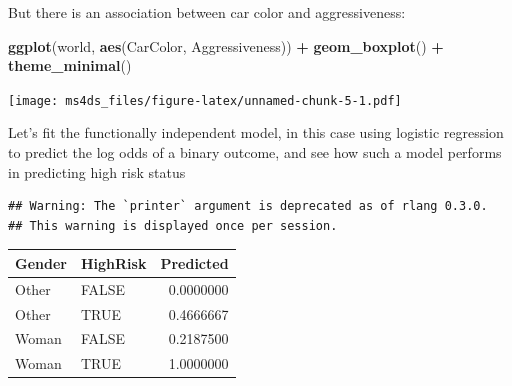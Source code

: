 \documentclass[]{book}
\newenvironment{Shaded}{\begin{snugshade}}{\end{snugshade}}
\newcommand{\KeywordTok}[1]{\textcolor[rgb]{0.13,0.29,0.53}{\textbf{#1}}}
\newcommand{\DataTypeTok}[1]{\textcolor[rgb]{0.13,0.29,0.53}{#1}}
\newcommand{\StringTok}[1]{\textcolor[rgb]{0.31,0.60,0.02}{#1}}
\newcommand{\OperatorTok}[1]{\textcolor[rgb]{0.81,0.36,0.00}{\textbf{#1}}}
\newcommand{\NormalTok}[1]{#1}
\theoremstyle{definition}
\theoremstyle{definition}
\theoremstyle{definition}
\theoremstyle{remark}
\begin{document}
But there is an association between car color and aggressiveness:

\begin{Shaded}
\begin{Highlighting}[]
\KeywordTok{ggplot}\NormalTok{(world, }\KeywordTok{aes}\NormalTok{(CarColor, Aggressiveness)) }\OperatorTok{+}\StringTok{ }\KeywordTok{geom_boxplot}\NormalTok{() }\OperatorTok{+}\StringTok{ }\KeywordTok{theme_minimal}\NormalTok{()}
\end{Highlighting}
\end{Shaded}

\texttt{[image: ms4ds\_files/figure-latex/unnamed-chunk-5-1.pdf]}

Let's fit the functionally independent model, in this case using
logistic regression to predict the log odds of a binary outcome, and see
how such a model performs in predicting high risk status

\begin{Shaded}
\end{Shaded}

\begin{verbatim}
## Warning: The `printer` argument is deprecated as of rlang 0.3.0.
## This warning is displayed once per session.
\end{verbatim}

\begin{tabular}{l|l|r}
\hline
Gender & HighRisk & Predicted\\
\hline
Other & FALSE & 0.0000000\\
\hline
Other & TRUE & 0.4666667\\
\hline
Woman & FALSE & 0.2187500\\
\hline
Woman & TRUE & 1.0000000\\
\hline
\end{tabular}
\end{document}
